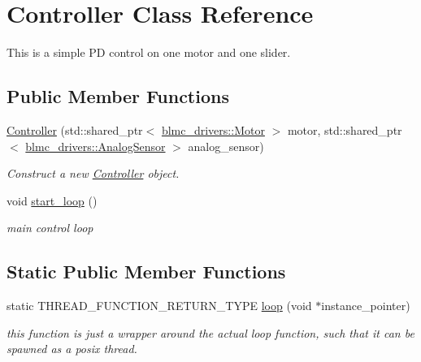 \hypertarget{classController}{}\section{Controller Class Reference}
\label{classController}


This is a simple PD control on one motor and one slider.  


\subsection*{Public Member Functions}
\begin{DoxyCompactItemize}
\item 
\hyperlink{classController_aceedb7c8fbd0fab8080fd7273d9dc65d}{Controller} (std\+::shared\+\_\+ptr$<$ \hyperlink{classblmc__drivers_1_1Motor}{blmc\+\_\+drivers\+::\+Motor} $>$ motor, std\+::shared\+\_\+ptr$<$ \hyperlink{classblmc__drivers_1_1AnalogSensor}{blmc\+\_\+drivers\+::\+Analog\+Sensor} $>$ analog\+\_\+sensor)
\begin{DoxyCompactList}\small\item\em Construct a new \hyperlink{classController}{Controller} object. \end{DoxyCompactList}\item 
void \hyperlink{classController_a63abf4d0c948dca6887de01050491f8d}{start\+\_\+loop} ()\hypertarget{classController_a63abf4d0c948dca6887de01050491f8d}{}\label{classController_a63abf4d0c948dca6887de01050491f8d}

\begin{DoxyCompactList}\small\item\em main control loop \end{DoxyCompactList}\end{DoxyCompactItemize}
\subsection*{Static Public Member Functions}
\begin{DoxyCompactItemize}
\item 
static T\+H\+R\+E\+A\+D\+\_\+\+F\+U\+N\+C\+T\+I\+O\+N\+\_\+\+R\+E\+T\+U\+R\+N\+\_\+\+T\+Y\+PE \hyperlink{classController_a596a9a35dcda61307e36bb2d8c4f067e}{loop} (void $\ast$instance\+\_\+pointer)\hypertarget{classController_a596a9a35dcda61307e36bb2d8c4f067e}{}\label{classController_a596a9a35dcda61307e36bb2d8c4f067e}

\begin{DoxyCompactList}\small\item\em this function is just a wrapper around the actual loop function, such that it can be spawned as a posix thread. \end{DoxyCompactList}\end{DoxyCompactItemize}
